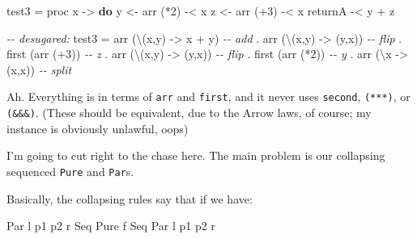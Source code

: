 \documentclass[]{article}
\newenvironment{Shaded}{}{}
\newcommand{\CommentTok}[1]{\textcolor[rgb]{0.38,0.63,0.69}{\textit{#1}}}
\newcommand{\DataTypeTok}[1]{\textcolor[rgb]{0.56,0.13,0.00}{#1}}
\newcommand{\DecValTok}[1]{\textcolor[rgb]{0.25,0.63,0.44}{#1}}
\newcommand{\KeywordTok}[1]{\textcolor[rgb]{0.00,0.44,0.13}{\textbf{#1}}}
\newcommand{\NormalTok}[1]{#1}
\newcommand{\OperatorTok}[1]{\textcolor[rgb]{0.40,0.40,0.40}{#1}}
\newcommand{\OtherTok}[1]{\textcolor[rgb]{0.00,0.44,0.13}{#1}}
\begin{document}
\begin{Shaded}
\begin{Highlighting}[]
\NormalTok{test3 }\OtherTok{=}\NormalTok{ proc x }\OtherTok{{-}>} \KeywordTok{do}
\NormalTok{    y }\OtherTok{<{-}}\NormalTok{ arr (}\OperatorTok{*}\DecValTok{2}\NormalTok{) }\OperatorTok{{-}<}\NormalTok{ x}
\NormalTok{    z }\OtherTok{<{-}}\NormalTok{ arr (}\OperatorTok{+}\DecValTok{3}\NormalTok{) }\OperatorTok{{-}<}\NormalTok{ x}
\NormalTok{    returnA }\OperatorTok{{-}<}\NormalTok{ y }\OperatorTok{+}\NormalTok{ z}

\CommentTok{{-}{-} desugared:}
\NormalTok{test3\textquotesingle{} }\OtherTok{=}\NormalTok{ arr (\textbackslash{}(x,y) }\OtherTok{{-}>}\NormalTok{ x }\OperatorTok{+}\NormalTok{ y)     }\CommentTok{{-}{-} add}
       \OperatorTok{.}\NormalTok{ arr (\textbackslash{}(x,y) }\OtherTok{{-}>}\NormalTok{ (y,x))     }\CommentTok{{-}{-} flip}
       \OperatorTok{.}\NormalTok{ first (arr (}\OperatorTok{+}\DecValTok{3}\NormalTok{))          }\CommentTok{{-}{-} z}
       \OperatorTok{.}\NormalTok{ arr (\textbackslash{}(x,y) }\OtherTok{{-}>}\NormalTok{ (y,x))     }\CommentTok{{-}{-} flip}
       \OperatorTok{.}\NormalTok{ first (arr (}\OperatorTok{*}\DecValTok{2}\NormalTok{))          }\CommentTok{{-}{-} y}
       \OperatorTok{.}\NormalTok{ arr (\textbackslash{}x }\OtherTok{{-}>}\NormalTok{ (x,x))         }\CommentTok{{-}{-} split}
\end{Highlighting}
\end{Shaded}

Ah. Everything is in terms of \texttt{arr} and \texttt{first}, and it never uses
\texttt{second}, \texttt{(***)}, or \texttt{(\&\&\&)}. (These should be
equivalent, due to the Arrow laws, of course; my instance is obviously unlawful,
oops)

I'm going to cut right to the chase here. The main problem is our collapsing
sequenced \texttt{Pure} and \texttt{Par}s.

Basically, the collapsing rules say that if we have:

\begin{Shaded}
\begin{Highlighting}[]
\DataTypeTok{Par}\NormalTok{ l p1 p2 r }\OtherTok{\textasciigrave{}Seq\textasciigrave{}} \DataTypeTok{Pure}\NormalTok{ f }\OtherTok{\textasciigrave{}Seq\textasciigrave{}} \DataTypeTok{Par}\NormalTok{ l\textquotesingle{} p1\textquotesingle{} p2\textquotesingle{} r\textquotesingle{}}
\end{Highlighting}
\end{Shaded}
\end{document}
